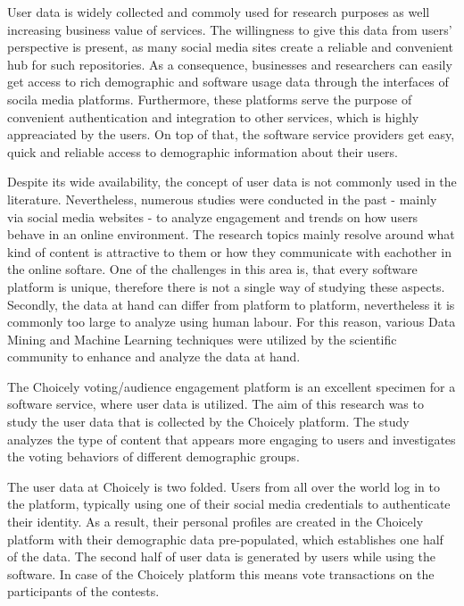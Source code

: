 User data is widely collected and commoly used for research purposes as well increasing business value of services. The willingness to give this data from users' perspective is present, as many social media sites create a reliable and convenient hub for such repositories. As a consequence, businesses and researchers can easily get access to rich demographic and software usage data through the interfaces of socila media platforms. Furthermore, these platforms serve the purpose of convenient authentication and integration to other services, which is highly appreaciated by the users. On top of that, the software service providers get easy, quick and reliable access to demographic information about their users. 

Despite its wide availability, the concept of user data is not commonly used in the literature. Nevertheless, numerous studies were conducted in the past - mainly via social media websites - to analyze engagement and trends on how users behave in an online environment. The research topics mainly resolve around what kind of content is attractive to them or how they communicate with eachother in the online softare. One of the challenges in this area is, that every software platform is unique, therefore there is not a single way of studying these aspects. Secondly, the data at hand can differ from platform to platform, nevertheless it is commonly too large to analyze using human labour. For this reason, various Data Mining and Machine Learning techniques were utilized by the scientific community to enhance and analyze the data at hand. 

The Choicely voting/audience engagement platform is an excellent specimen for a software service, where user data is utilized. The aim of this research was to study the user data that is collected by the Choicely platform. The study analyzes the type of content that appears more engaging to users and investigates the voting behaviors of different demographic groups. 

The user data at Choicely is two folded. Users from all over the world log in to the platform, typically using one of their social media credentials to authenticate their identity. As a result, their personal profiles are created in the Choicely platform with their demographic data pre-populated, which establishes one half of the data. The second half of user data is generated by users while using the software. In case of the Choicely platform this means vote transactions on the participants of the contests. 

